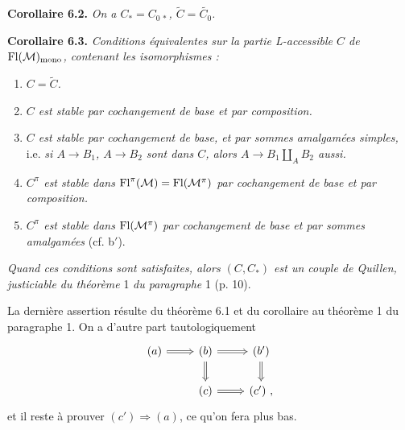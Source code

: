 \textbf{Corollaire 6.2.} \textit{On a $C_{*} = C_{0\,*}$, $\widetilde{C} = \widetilde{C_{0}}$.}

\textbf{Corollaire 6.3.} \textit{Conditions équivalentes sur la partie L-accessible $C$ de} $\mathrm{Fl}(\mathcal{M})_{\mathrm{mono}}$\textit{, contenant les isomorphismes :}
\begin{enumerate}[label={}]
\item[a)] \textit{$C = \widetilde{C}$.}
\item[b)] \textit{$C$ est stable par cochangement de base et par composition.}
\item[b$'$)] \textit{$C$ est stable par cochangement de base, et par sommes amalgamées simples,} i.e. \textit{si $A \longrightarrow B_{1}$, $A \longrightarrow B_{2}$ sont dans $C$, alors $A \longrightarrow B_{1} \amalg_{A} B_{2}$ aussi.}
\item[c)] \textit{$C^{\pi}$ est stable dans} $\mathrm{Fl}^{\pi}(\mathcal{M}) = \mathrm{Fl}(\mathcal{M}^{\pi})$ \textit{par cochangement de base et par composition.}
\item[c$'$)] \textit{$C^{\pi}$ est stable dans} $\mathrm{Fl}(\mathcal{M}^{\pi})$ \textit{par cochangement de base et par sommes amalgamées} (cf. b$'$).
\end{enumerate}
\textit{Quand ces conditions sont satisfaites, alors $(C,C_{*})$ est un couple de Quillen, justiciable du théorème} 1 \textit{du paragraphe} 1 (p. 10).

La dernière assertion résulte du théorème 6.1 et du corollaire au théorème 1 du paragraphe 1. On a
%
d'autre part tautologiquement
\[
\begin{tikzcd}
(a) \arrow[r, Rightarrow] & (b) \arrow[r, Rightarrow] \arrow[d, Rightarrow] & (b') \arrow[d, Rightarrow] \\
 & (c) \arrow[r, Rightarrow] & (c') \ ,
\end{tikzcd}
\]
et il reste à prouver $(c') \Longrightarrow (a)$, ce qu'on fera plus bas.

